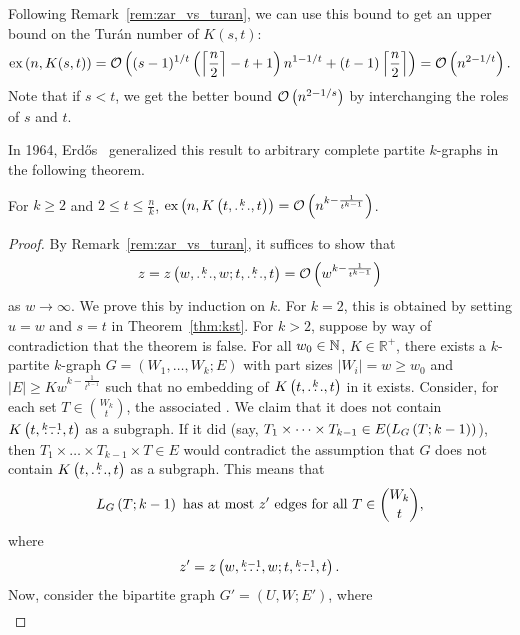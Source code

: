 \begin{remark}
    Following Remark~\ref{rem:zar_vs_turan}, we can use this bound to get an upper bound on the Turán number of $K(s, t)$:
    \[
        \text{ex} \left( n, K(s, t) \right) =
        \mathcal{O}\left((s - 1)^{1 / t}\left(\left\lceil\frac{n}{2}\right\rceil - t + 1\right)n^{1 - 1 / t} + (t - 1)\left\lceil\frac{n}{2}\right\rceil\right) =
        \mathcal{O}\left(n^{2 - 1 / t}\right).
    \]
    Note that if $s < t$, we get the better bound $\mathcal{O}\left(n^{2 - 1 / s}\right)$ by interchanging the roles of $s$ and $t$.
\end{remark}

In 1964, Erdős~\cite{Erods1964} generalized this result to arbitrary complete partite $k$-graphs in the following theorem.

\begin{theorem}\label{thm:erdos64}
    For $k \geq 2$ and $2 \leq t \leq \frac{n}{k}$,
    $\text{ex} \left( n, K\left(t, \overset{k}{\dots}, t\right) \right) = \mathcal{O}\left(n^{k - \frac{1}{t^{k-1}}}\right)$.
    \begin{proof}
        By Remark~\ref{rem:zar_vs_turan}, it suffices to show that
        \[
            z = z\left(w, \overset{k}{\dots}, w; t, \overset{k}{\dots}, t\right) = \mathcal{O}\left(w^{k - \frac{1}{t^{k-1}}}\right)
        \]
        as $w \to \infty$.
        We prove this by induction on $k$.
        For $k=2$, this is obtained by setting $u = w$ and $s = t$ in Theorem~\ref{thm:kst}.
        For $k > 2$, suppose by way of contradiction that the theorem is false.
        For all ${w_0 \in \mathbb{N}}$, ${K \in \mathbb{R}^+}$, there exists a $k$-partite $k$-graph $G = (W_1, \dots, W_k; E)$ with part sizes
        $|W_i| = w \geq w_0$ and ${|E| \geq K w^{k - \frac{1}{t^{k-1}}}}$ such that no embedding of $K\left(t, \overset{k}{\dots}, t\right)$ in it exists.
        Consider, for each set $T \in \binom{W_k}{t}$, the associated 
        .
        We claim that it does not contain $K\left(t, \overset{k-1}{\dots}, t\right)$ as a subgraph.
        If it did (say, $T_1 \times \dots \times T_{k-1} \in E(L_{G}\left(T; k-1\right))$),
        then $T_1 \times \dots \times T_{k-1} \times T \in E$
        would contradict the assumption that $G$ does not contain $K\left(t, \overset{k}{\dots}, t\right)$ as a subgraph.
        This means that
        \begin{equation} \label{eq:conditionlink}
            L_{G}\left(T; k-1\right) \text{ has at most $z'$ edges for all } T \in \binom{W_k}{t},
        \end{equation}
        where
        \[
            z' = z\left(w, \overset{k-1}{\dots}, w; t, \overset{k-1}{\dots}, t\right).
        \]
        Now, consider the bipartite graph $G' = (U, W; E')$, where
        \begin{align*}

\end{align*}
\end{proof}
\end{theorem}
